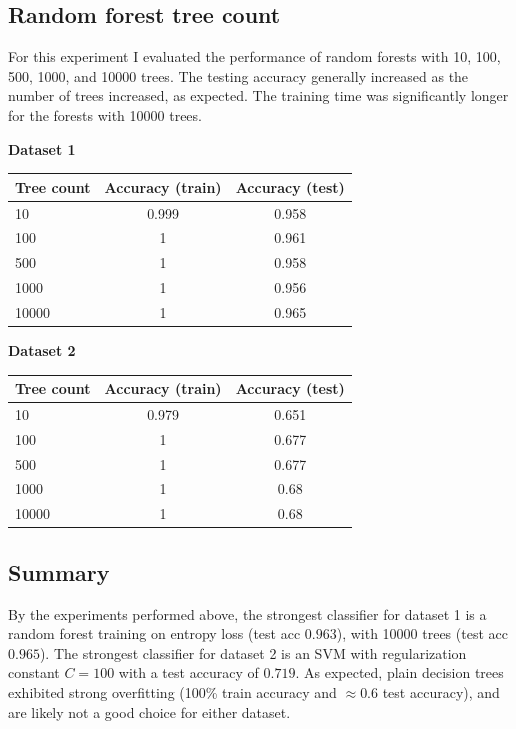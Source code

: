 \documentclass{article}
\begin{document}
\subsection{Random forest tree count}

For this experiment I evaluated the performance of random forests with 10, 100, 500, 1000, and 10000 trees. The testing accuracy generally increased as the number of trees increased, as expected. The training time was significantly longer for the forests with 10000 trees.

\begin{center}\textbf{Dataset 1}\end{center}
\begin{center}
\begin{tabular}{| l | c | c |}
    \hline
    \textbf{Tree count} & \textbf{Accuracy (train)} & \textbf{Accuracy (test)} \\
    \hline
        10 & 0.999 & 0.958 \\
        100 & 1 & 0.961\\
        500 & 1 & 0.958\\
        1000 & 1 & 0.956 \\
        10000 & 1 & 0.965 \\
    \hline
\end{tabular}
\end{center}

\begin{center}\textbf{Dataset 2}\end{center}
\begin{center}
\begin{tabular}{| l | c | c |}
    \hline
    \textbf{Tree count} & \textbf{Accuracy (train)} & \textbf{Accuracy (test)} \\
    \hline
        10 & 0.979 & 0.651 \\
        100 & 1 & 0.677\\
        500 & 1 & 0.677\\
        1000 & 1 & 0.68 \\
        10000 & 1 & 0.68 \\
    \hline
\end{tabular}
\end{center}

\subsection{Summary}

By the experiments performed above, the strongest classifier for dataset 1 is a random forest training on entropy loss (test acc $0.963$), with 10000 trees (test acc $0.965$).
The strongest classifier for dataset 2 is an SVM with regularization constant $C=100$ with a test accuracy of $0.719$.
As expected, plain decision trees exhibited strong overfitting (100\% train accuracy and $\approx$0.6 test accuracy), and are likely not a good choice for either dataset.
\end{document}
